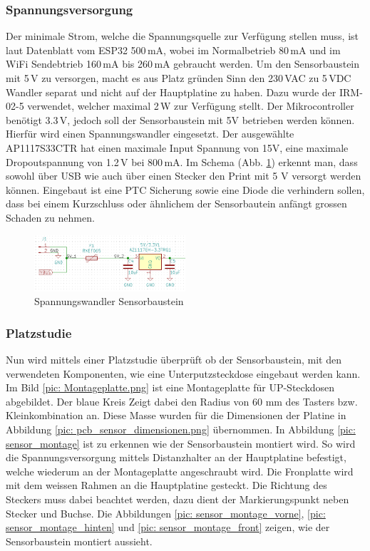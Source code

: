 \subsubsection{Spannungsversorgung}
Der minimale Strom, welche die Spannungsquelle zur Verfügung stellen muss, ist laut Datenblatt vom ESP32 500\,mA, wobei im Normalbetrieb 80\,mA und im WiFi Sendebtrieb 160\,mA bis 260\,mA gebraucht werden.
Um den Sensorbaustein mit 5\,V zu versorgen, macht es aus Platz gründen Sinn den 230\,VAC zu 5\,VDC Wandler separat und nicht auf der Hauptplatine zu haben. Dazu wurde der IRM-02-5 verwendet, welcher maximal 2\,W zur Verfügung stellt. Der Mikrocontroller benötigt 3.3\,V, jedoch soll der Sensorbaustein mit 5V betrieben werden können. Hierfür wird einen Spannungswandler eingesetzt. Der ausgewählte AP1117S33CTR hat einen maximale Input Spannung von 15V, eine maximale Dropoutspannung von 1.2\,V bei 800\,mA. Im Schema (Abb. \ref{pic: Wandler_Sensor}) erkennt man, dass sowohl über USB wie auch über einen Stecker den Print mit 5 V versorgt werden können. Eingebaut ist eine PTC Sicherung sowie eine Diode die verhindern sollen, dass bei einem Kurzschluss oder ähnlichem der Sensorbautein anfängt grossen Schaden zu nehmen.

\begin{figure}[h!]
	\centering
	\includegraphics[width=0.5\textwidth]{graphics/shematics_sensor_33V.png}
	\caption{Spannungswandler Sensorbaustein}
	\label{pic: Wandler_Sensor}
\end{figure}

\subsubsection{Platzstudie}
Nun wird mittels einer Platzstudie überprüft ob der Sensorbaustein, mit den verwendeten Komponenten, wie eine Unterputzsteckdose eingebaut werden kann.
Im Bild \ref{pic: Montageplatte.png} ist eine Montageplatte für UP-Steckdosen abgebildet. Der blaue Kreis Zeigt dabei den  Radius von 60 mm des Tasters bzw. Kleinkombination an. Diese Masse wurden für die Dimensionen der Platine in Abbildung \ref{pic: pcb_sensor_dimensionen.png} übernommen. In Abbildung \ref{pic: sensor_montage} ist zu erkennen wie der Sensorbaustein montiert wird. So wird die Spannungsversorgung mittels Distanzhalter an der Hauptplatine befestigt, welche wiederum an der Montageplatte angeschraubt wird. Die Fronplatte wird mit dem weissen Rahmen an die Hauptplatine gesteckt. Die Richtung des Steckers muss dabei beachtet werden, dazu dient der Markierungspunkt neben Stecker und Buchse. Die Abbildungen  \ref{pic: sensor_montage_vorne}, \ref{pic: sensor_montage_hinten} und \ref{pic: sensor_montage_front} zeigen, wie der Sensorbaustein montiert aussieht.

